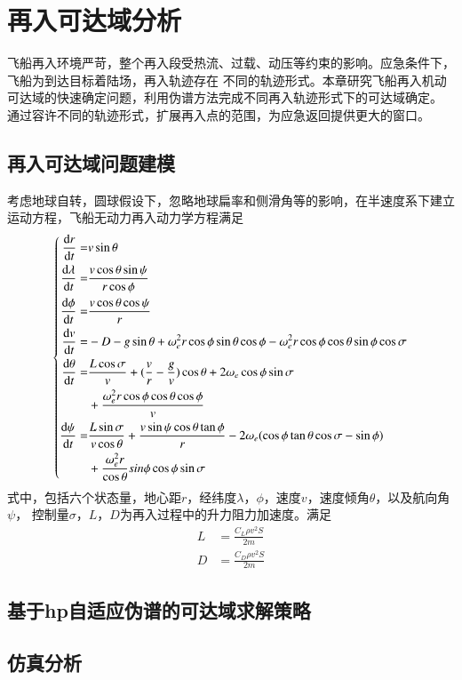 \chapter{再入可达域分析}

飞船再入环境严苛，整个再入段受热流、过载、动压等约束的影响。应急条件下，飞船为到达目标着陆场，再入轨迹存在
不同的轨迹形式。本章研究飞船再入机动可达域的快速确定问题，利用伪谱方法完成不同再入轨迹形式下的可达域确定。
通过容许不同的轨迹形式，扩展再入点的范围，为应急返回提供更大的窗口。

\section{再入可达域问题建模}

考虑地球自转，圆球假设下，忽略地球扁率和侧滑角等的影响，在半速度系下建立运动方程，飞船无动力再入动力学方程满足
\begin{equation}
	\left\{
	\begin{aligned}
		\frac{\dif r}{\dif t}=       & v \sin \theta                                                           \\
		\frac{\dif \lambda}{\dif t}= & \frac{v \cos \theta \sin \psi}
		{r \cos \phi}                                                                                          \\
		\frac{\dif \phi}{\dif t}=    & \frac{v \cos \theta \cos \psi}{r}                                       \\
		\frac{\dif v}{\dif t}=       & -D-g \sin \theta +\omega_e^2r\cos\phi \sin\theta \cos\phi-
		\omega_e^2r\cos\phi\cos\theta\sin\phi\cos\sigma                                                        \\
		\frac{\dif\theta}{\dif t} =  & \frac{L\cos\sigma}{v}+(\frac{v}{r}-
		\frac{g}{v})\cos\theta+2\omega_e\cos\phi\sin\sigma                                                     \\
		                             & {}+\frac{\omega_e^2r\cos\phi\cos\theta\cos\phi}{v}                      \\
		\frac{\dif\psi}{\dif t} =    & \frac{L\sin\sigma}{v\cos\theta}+\frac{v\sin \psi\cos \theta\tan\phi}{r}
		-2\omega_e(\cos\phi\tan\theta\cos\sigma-\sin\phi)                                                      \\
		                             & {}+\frac{\omega_e^2r}{\cos\theta}sin\phi\cos\phi\sin\sigma
	\end{aligned}
	\right.
\end{equation}
式中，包括六个状态量，地心距$r$，经纬度$\lambda$，$\phi$，速度$v$，速度倾角$\theta$，以及航向角$\psi$，
控制量$\sigma$，$L$，$D$为再入过程中的升力阻力加速度。满足
\begin{align}
	L & =\frac{C_L\rho v^2S}{2m} \\
	D & =\frac{C_D\rho v^2S}{2m}
\end{align}

\section{基于hp自适应伪谱的可达域求解策略}

\section{仿真分析}

\subsection{}